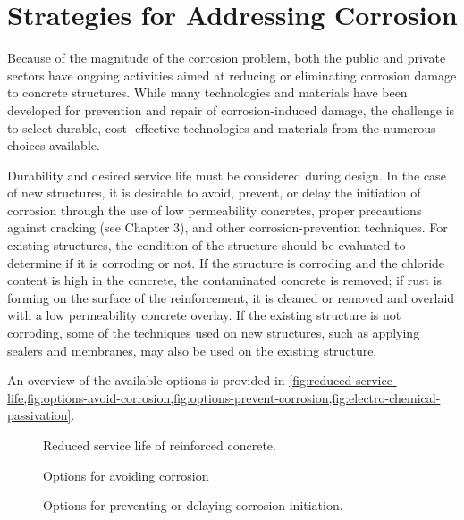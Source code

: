 \section{Strategies for Addressing Corrosion}
\label{sec:strategy-address-corrosion}
Because of the magnitude of the corrosion problem, both the public and private sectors have ongoing activities
aimed at reducing or eliminating corrosion damage to concrete structures. While many technologies and materials
have been developed for prevention and repair of corrosion-induced damage, the challenge is to select durable, cost-
effective technologies and materials from the numerous choices available.

Durability and desired service life must be considered during design. In the case of new structures, it is desirable
to avoid, prevent, or delay the initiation of corrosion through the use of low permeability concretes, proper
precautions against cracking (see Chapter 3), and other corrosion-prevention techniques. For existing structures, the
condition of the structure should be evaluated to determine if it is corroding or not. If the structure is corroding and
the chloride content is high in the concrete, the contaminated concrete is removed; if rust is forming on the surface of
the reinforcement, it is cleaned or removed and overlaid with a low permeability concrete overlay. If the existing
structure is not corroding, some of the techniques used on new structures, such as applying sealers and membranes,
may also be used on the existing structure.

An overview of the available options is provided in \cref{fig:reduced-service-life,fig:options-avoid-corrosion,fig:options-prevent-corrosion,fig:electro-chemical-passivation}.

\begin{figure}
  \caption{Reduced service life of reinforced concrete.}
  \label{fig:reduced-service-life}
\end{figure}

\begin{figure}
  \caption{Options for avoiding corrosion}
  \label{fig:options-avoid-corrosion}
\end{figure}

\begin{figure}
  \caption{Options for preventing or delaying corrosion initiation.}
  \label{fig:options-prevent-corrosion}
\end{figure}

